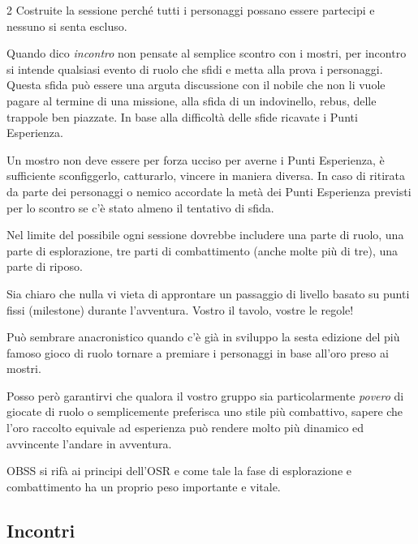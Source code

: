 \begin{multicols}{2}
Costruite la sessione perché tutti i personaggi possano essere partecipi e nessuno si senta escluso.



Quando dico \emph{incontro} non pensate al semplice scontro con i mostri, per incontro si intende qualsiasi evento di ruolo che sfidi e metta alla prova i personaggi. Questa sfida può essere una arguta discussione con il nobile che non li vuole pagare al termine di una missione, alla sfida di un indovinello, rebus, delle trappole ben piazzate. In base alla difficoltà delle sfide ricavate i Punti Esperienza.

Un mostro non deve essere per forza ucciso per averne i Punti Esperienza, è sufficiente sconfiggerlo, catturarlo, vincere in maniera diversa. In caso di ritirata da parte dei personaggi o nemico accordate la metà dei Punti Esperienza previsti per lo scontro se c'è stato almeno il tentativo di sfida.

Nel limite del possibile ogni sessione dovrebbe includere una parte di ruolo, una parte di esplorazione, tre parti di combattimento (anche molte più di tre), una parte di riposo.

\medskip

\begin{narratore}
Sia chiaro che nulla vi vieta di approntare un passaggio di livello basato su punti fissi (milestone) durante l'avventura. Vostro il tavolo, vostre le regole!

\medskip

Può sembrare anacronistico quando c'è già in sviluppo la sesta edizione del più famoso gioco di ruolo tornare a premiare i personaggi in base all'oro preso ai mostri.

Posso però garantirvi che qualora il vostro gruppo sia particolarmente \emph{povero} di giocate di ruolo o semplicemente preferisca uno stile più combattivo, sapere che l'oro raccolto equivale ad esperienza può rendere molto più dinamico ed avvincente l'andare in avventura.

OBSS si rifà ai principi dell'OSR e come tale la fase di esplorazione e combattimento ha un proprio peso importante e vitale.
\end{narratore}

\subsection{Incontri}\label{incontri}


\end{multicols}
